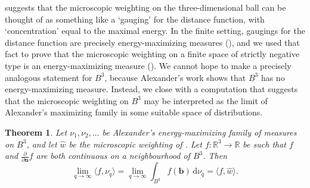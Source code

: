 \documentclass[a4paper, oneside, reqno]{amsart}
\newtheorem{theorem}{Theorem}[section]
\theoremstyle{definition}
\theoremstyle{remark}
\numberwithin{equation}{section}
\renewcommand{\vec}{\mathbf}
\newcommand{\R}{\mathbb{R}}
\newcommand{\dd}{\mathrm{d}} %
\newcommand{\dispair}[2]{\langle #2,#1 \rangle}
\begin{document}
 suggests that the microscopic weighting on the three-dimensional ball can be thought of as something like a `gauging' for the distance function, with `concentration' equal to the maximal energy. In the finite setting, gaugings for the distance function are precisely energy-maximizing measures (), and we used that fact to prove that the microscopic weighting on a finite space of strictly negative type is an energy-maximizing measure (). We cannot hope to make a precisely analogous statement for \(B^3\), because Alexander's work shows that \(B^3\) has no energy-maximizing measure. Instead, we close with a computation that suggests that the microscopic weighting on \(B^3\) may be interpreted as the limit of Alexander's maximizing family in some suitable space of distributions.

\begin{theorem}
\label{thm:alexander_limit}
    Let \(\nu_1, \nu_2, \dots\) be Alexander's energy-maximizing family of measures on \(B^3\), and let  \(\widehat{w}\) be the microscopic weighting of . Let \(f \colon \R^3 \to \R\) be such that \(f\) and \(\tfrac{\partial}{\partial \vec{n}} f\) are both continuous on a neighbourhood of \(B^3\). Then
    \[
        \lim_{q \to \infty} \dispair{\nu_q}{f} = \lim_{q\to \infty} 
        \int_{B^3} f(\vec{b})  \,\dd \nu_q 
        =
        \dispair{\widehat{w}}{f}.
    \]
\end{theorem}
\end{document}
